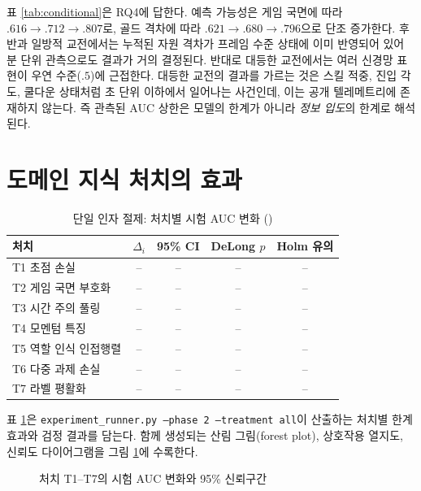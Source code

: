 표 \ref{tab:conditional}은 RQ4에 답한다. 예측 가능성은 게임 국면에 따라 $.616 \to .712 \to .807$로, 골드 격차에 따라 $.621 \to .680 \to .796$으로 단조 증가한다. 후반과 일방적 교전에서는 누적된 자원 격차가 프레임 수준 상태에 이미 반영되어 있어 분 단위 관측으로도 결과가 거의 결정된다. 반대로 대등한 교전에서는 여러 신경망 표현이 우연 수준($.5$)에 근접한다. 대등한 교전의 결과를 가르는 것은 스킬 적중, 진입 각도, 쿨다운 상태처럼 초 단위 이하에서 일어나는 사건인데, 이는 공개 텔레메트리에 존재하지 않는다. 즉 관측된 AUC 상한은 모델의 한계가 아니라 \emph{정보 입도}의 한계로 해석된다.

\section{도메인 지식 처치의 효과}
\label{sec:results-ablation}

\begin{table}[htbp]
  \centering
  \caption{단일 인자 절제: 처치별 시험 AUC 변화 ()}
  \label{tab:ablation}
  \small
  \begin{tabular}{@{}lcccc@{}}
    \toprule
    처치 & $\Delta_i$ & 95\% CI & DeLong $p$ & Holm 유의 \\
    \midrule
    T1 초점 손실 & -- & -- & -- & -- \\
    T2 게임 국면 부호화 & -- & -- & -- & -- \\
    T3 시간 주의 풀링 & -- & -- & -- & -- \\
    T4 모멘텀 특징 & -- & -- & -- & -- \\
    T5 역할 인식 인접행렬 & -- & -- & -- & -- \\
    T6 다중 과제 손실 & -- & -- & -- & -- \\
    T7 라벨 평활화 & -- & -- & -- & -- \\
    \bottomrule
  \end{tabular}
\end{table}

표 \ref{tab:ablation}은 \texttt{experiment\_runner.py --phase 2 --treatment all}이 산출하는 처치별 한계 효과와 검정 결과를 담는다. 함께 생성되는 산림 그림(forest plot), 상호작용 열지도, 신뢰도 다이어그램을 그림 \ref{fig:forest}에 수록한다. 

\begin{figure}[htbp]
  \centering
  \caption{처치 T1--T7의 시험 AUC 변화와 95\% 신뢰구간}
  \label{fig:forest}
\end{figure}

